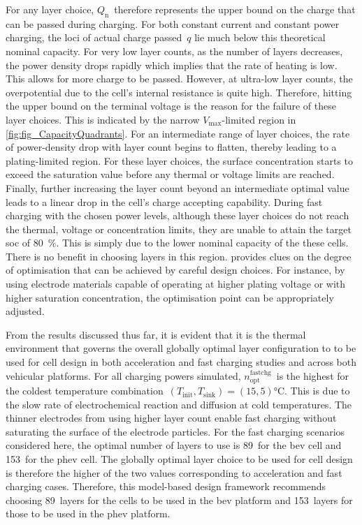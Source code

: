 For any layer  choice, $Q_\text{n}$~therefore represents the upper  bound on the
charge  that can  be  passed  during charging.  For  both  constant current  and
constant power  charging, the loci of  actual charge passed~$q$ lie  much below
this theoretical nominal  capacity. For very low layer counts,  as the number of
layers decreases, the power density drops rapidly which implies that the rate of
heating is low. This allows for more  charge to be passed. However, at ultra-low
layer counts, the  overpotential due to the cell's internal  resistance is quite
high.  Therefore,  hitting the  upper  bound  on  the  terminal voltage  is  the
reason  for  the failure  of  these  layer choices.  This  is  indicated by  the
narrow \mbox{$V_\text{max}$-limited} region in \cref{fig:fig_CapacityQuadrants}.
For an intermediate range of  layer choices, the rate of power-density  drop
with layer count begins to flatten, thereby leading  to a plating-limited
region. For these layer choices, the  surface concentration starts to exceed the
saturation value before any  thermal or voltage  limits are reached. Finally,
further increasing the layer count beyond  an intermediate optimal value leads
to  a linear drop in the cell's  charge accepting  capability. During fast
charging with  the chosen power levels, although these layer choices  do not
reach the thermal, voltage or concentration  limits,  they  are unable  to
attain  the  target  \gls{soc}  of \SI{80}{\percent}. This is simply due to the
lower nominal capacity of the these cells.  There is  no  benefit in choosing
layers  in this  region.  provides clues
on the degree  of optimisation  that can  be achieved  by
careful  design choices.  For instance, by using electrode materials capable  of  operating at  higher plating 
voltage  or with  higher  saturation concentration, the optimisation point can
be appropriately adjusted.


From  the results  discussed thus  far, it  is evident  that it  is the  thermal
environment  that  governs   the  overall globally optimal  layer configuration
to to be used for cell design in  both acceleration and fast charging studies
and across both vehicular platforms. For all charging powers simulated,
$n^\text{fastchg}_\text{opt}$~is the highest for the coldest temperature
combination~${(T_\text{init},T_\text{sink}) =  (15, 5) \si{\degreeCelsius}}$.
This is due to  the slow rate of electrochemical reaction and diffusion  at cold
temperatures. The thinner  electrodes from  using higher layer count enable fast
charging without saturating the surface of the electrode particles. For the fast
charging scenarios considered here,  the optimal number of layers to use is
89~for the \gls{bev} cell and  153~for the \gls{phev} cell. The globally optimal
layer choice to be  used for cell design  is therefore the higher of the two
values corresponding  to acceleration and fast charging cases. Therefore, this
model-based design framework recommends choosing 89~layers for the cells to be 
used in the \gls{bev} platform and 153~layers  for those to be used in the
\gls{phev} platform.


